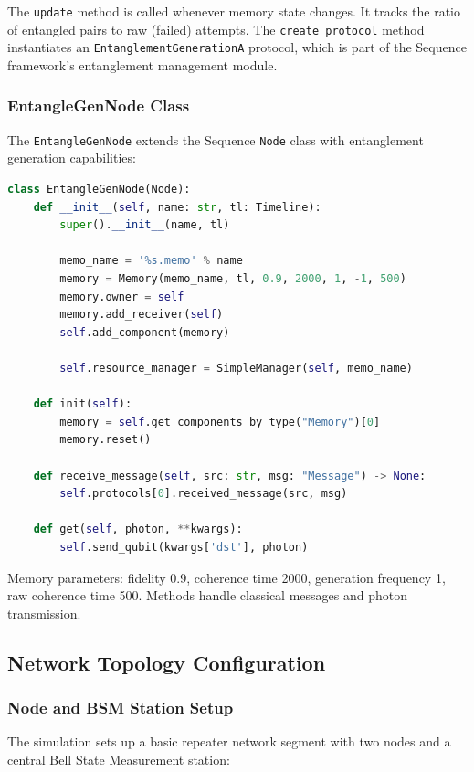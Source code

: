 The \texttt{update} method is called whenever memory state changes. It tracks the ratio of entangled pairs to raw (failed) attempts. The \texttt{create\_protocol} method instantiates an \texttt{EntanglementGenerationA} protocol, which is part of the Sequence framework's entanglement management module.

\subsubsection{EntangleGenNode Class}

The \texttt{EntangleGenNode} extends the Sequence \texttt{Node} class with entanglement generation capabilities:

\begin{lstlisting}[language=Python, breaklines=true]
class EntangleGenNode(Node):
    def __init__(self, name: str, tl: Timeline):
        super().__init__(name, tl)

        memo_name = '%s.memo' % name
        memory = Memory(memo_name, tl, 0.9, 2000, 1, -1, 500)
        memory.owner = self
        memory.add_receiver(self)
        self.add_component(memory)

        self.resource_manager = SimpleManager(self, memo_name)

    def init(self):
        memory = self.get_components_by_type("Memory")[0]
        memory.reset()

    def receive_message(self, src: str, msg: "Message") -> None:
        self.protocols[0].received_message(src, msg)

    def get(self, photon, **kwargs):
        self.send_qubit(kwargs['dst'], photon)
\end{lstlisting}

Memory parameters: fidelity 0.9, coherence time 2000, generation frequency 1, raw coherence time 500. Methods handle classical messages and photon transmission.

\subsection{Network Topology Configuration}

\subsubsection{Node and BSM Station Setup}

The simulation sets up a basic repeater network segment with two nodes and a central Bell State Measurement station:

